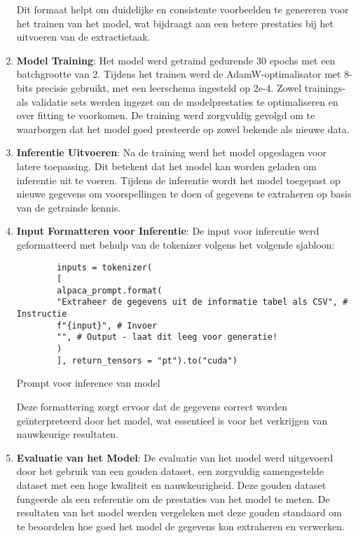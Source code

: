 \begin{enumerate}
Dit formaat helpt om duidelijke en consistente voorbeelden te genereren voor het trainen van het model, wat bijdraagt aan een betere prestaties bij het uitvoeren van de extractietaak.

\item\textbf{ Model Training}:
Het model werd getraind gedurende 30 epochs met een batchgrootte van 2. Tijdens het trainen werd de AdamW-optimalisator met 8-bits precisie gebruikt, met een leerschema ingesteld op 2e-4. Zowel trainings- als validatie sets werden ingezet om de modelprestaties te optimaliseren en over fitting te voorkomen. De training werd zorgvuldig gevolgd om te waarborgen dat het model goed presteerde op zowel bekende als nieuwe data.

\item \textbf{Inferentie Uitvoeren}:
Na de training werd het model opgeslagen voor latere toepassing. Dit betekent dat het model kan worden geladen om inferentie uit te voeren. Tijdens de inferentie wordt het model toegepast op nieuwe gegevens om voorspellingen te doen of gegevens te extraheren op basis van de getrainde kennis.


\item\textbf{ Input Formatteren voor Inferentie}:
De input voor inferentie werd geformatteerd met behulp van de tokenizer volgens het volgende sjabloon:

\begin{listing}
    \begin{verbatim}
        inputs = tokenizer(
        [
        alpaca_prompt.format(
        "Extraheer de gegevens uit de informatie tabel als CSV", # Instructie
        f"{input}", # Invoer
        "", # Output - laat dit leeg voor generatie!
        )
        ], return_tensors = "pt").to("cuda")
    \end{verbatim}
    \caption{Prompt voor inference van model}
\end{listing}

Deze formattering zorgt ervoor dat de gegevens correct worden geïnterpreteerd door het model, wat essentieel is voor het verkrijgen van nauwkeurige resultaten.

\item \textbf{Evaluatie van het Model}:
De evaluatie van het model werd uitgevoerd door het gebruik van een gouden dataset, een zorgvuldig samengestelde dataset met een hoge kwaliteit en nauwkeurigheid. Deze gouden dataset fungeerde als een referentie om de prestaties van het model te meten. De resultaten van het model werden vergeleken met deze gouden standaard om te beoordelen hoe goed het model de gegevens kon extraheren en verwerken.


\end{enumerate}
